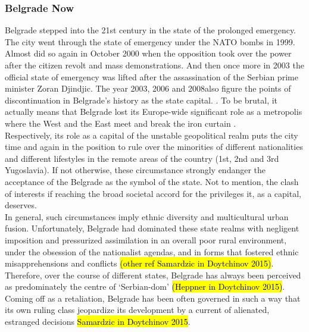 \documentclass[11pt]{report}
\begin{document}
\subsubsection{Belgrade Now}
Belgrade stepped into the 21st century in the state of the prolonged emergency.
The city went through the state of emergency under the NATO bombs in 1999. Almost did so again in October 2000 when the opposition took over the power after the citizen revolt and mass demonstrations. And then once more in 2003 the official state of emergency was lifted after the assassination of the Serbian prime minister Zoran Djindjic. The year 2003, 2006 and 2008\footnotemark also figure the points of discontinuation in Belgrade's history as the state capital.
.
To be brutal, it actually means that Belgrade lost its Europe-wide significant role as a metropolis where the West and the East meet and break the iron curtain \cite{(Grozdanic 2008)}.
\\
Respectively, its role as a capital of the unstable geopolitical realm puts the city time and again in the position to rule over the minorities of different nationalities and different lifestyles in the remote areas of the country (1st, 2nd and 3rd Yugoslavia). If not otherwise, these circumstance strongly endanger the acceptance of the Belgrade as the symbol of the state. Not to mention, the clash of interests if reaching the broad societal accord for the privileges it, as a capital, deserves.
\\
In general, such circumstances imply ethnic diversity and multicultural urban fusion.
Unfortunately, Belgrade had dominated these state realms with negligent imposition and pressurized  assimilation in an overall poor  rural  environment, under  the obsession of the nationalist agendas, and in forms  that  fostered ethnic misapprehensions  and  conflicts \hl{(other ref Samardzic in Doytchinov 2015)}.
Therefore, over the course of different states, Belgrade has always been perceived as predominately the centre of ‘Serbian-dom’ \hl{(Heppner in Doytchinov 2015)}.
Coming off as a retaliation, Belgrade has been often governed in such a way that its own ruling class jeopardize its development by a current of alienated, estranged  decisions \hl{Samardzic in Doytchinov 2015}.
\\
\end{document}
